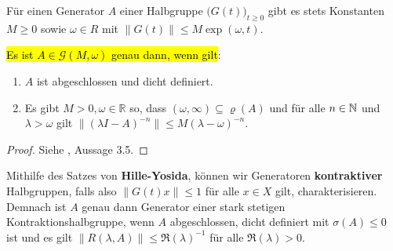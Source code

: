 \par
Für einen Generator $A$ einer Halbgruppe $\big(G(t)\big)_{t\geq0}$ gibt es stets Konstanten $M\geq0$ sowie $\omega\in R$ mit $\|G(t)\|\leq M\exp(\omega, t)$. 


\begin{fsatz}\label{Hille-Yosida}
\hl{Es ist $A\in \mathcal G(M,\omega)$ genau dann, wenn gilt}:
\begin{enumerate}
\item $A$ ist abgeschlossen und dicht definiert.
\item Es gibt $M> 0, \omega \in\mathbb R$ so, dass $(\omega, \infty)\subseteq \varrho(A)$ und für alle $n\in\mathbb{N}$ und $\lambda > \omega$ gilt $\|(\lambda I- A)^{-n}\|\leq M (\lambda - \omega)^{-n}$.
\end{enumerate}
\end{fsatz}

\begin{proof}
Siehe \cite{banasiak_arlotti_2006}, Aussage 3.5.
\end{proof}

\par
Mithilfe des Satzes von \textbf{Hille-Yosida}, können wir Generatoren \textbf{kontraktiver} Halbgruppen, falls also $\|G(t)x\|\leq 1$ für alle $x\in X$ gilt, charakterisieren. Demnach ist $A$ genau dann Generator einer stark stetigen Kontraktionshalbgruppe, wenn $A$  abgeschlossen, dicht definiert mit $\sigma(A)\leq 0$ ist und es gilt $\|R(\lambda, A)\|\leq \mathfrak R(\lambda)^{-1}$ für alle $\mathfrak R(\lambda) > 0$.


